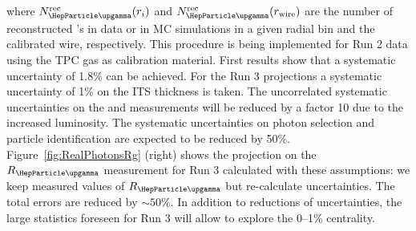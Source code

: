 where $N_{\PGg}^{\rm rec}(r_i)$ and $N_{\PGg}^{\rm rec}(r_{\rm wire})$ are the number of reconstructed \PGg 's in data or in MC simulations in a given radial bin and the calibrated wire, respectively.
This procedure is being implemented for Run 2 data using the TPC gas as calibration material. First results show that a systematic uncertainty of 1.8\% can be achieved. For the Run 3 projections a systematic uncertainty of 1\% on the ITS thickness is taken. The uncorrelated systematic uncertainties on the \PGpz and \PGh measurements will be reduced by a factor 10 due to the increased luminosity. The systematic uncertainties on photon selection and particle identification are expected to be reduced by 50\%.
Figure~\ref{fig:RealPhotonsRg} (right) shows the projection on the $R_{\PGg}$ measurement 
for Run 3 calculated with these assumptions: we keep measured values of $R_{\PGg}$ but re-calculate uncertainties. The total errors are reduced by $\sim50$\%. In addition to reductions of uncertainties, the large statistics foreseen for Run 3 will allow to explore the 0--1\% centrality. 





